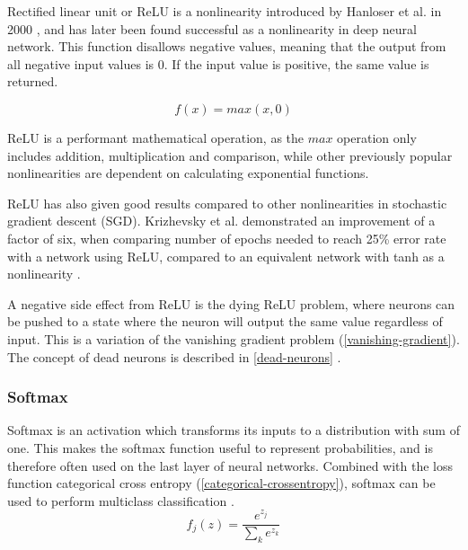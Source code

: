 Rectified linear unit or ReLU is a nonlinearity introduced by Hanloser et al. in 2000 \cite{smith_scientist_1997}, and has later been found successful as a nonlinearity in deep neural network. This function disallows negative values, meaning that the output from all negative input values is 0. If the input value is positive, the same value is returned.


\begin{equation} \label{eqn:relu}
    f(x) = max(x, 0)
\end{equation}

ReLU is a performant mathematical operation, as the $max$ operation only includes addition, multiplication and comparison, while other previously popular nonlinearities are dependent on calculating exponential functions. 

ReLU has also given good results compared to other nonlinearities in stochastic gradient descent (SGD). Krizhevsky et al. demonstrated an improvement of a factor of six, when comparing number of epochs needed to reach 25\% error rate with a network using ReLU, compared to an equivalent network with tanh as a nonlinearity \cite{krizhevsky_imagenet_2012}.

A negative side effect from ReLU is the dying ReLU problem, where neurons can be pushed to a state where the neuron will output the same value regardless of input. This is a variation of the vanishing gradient problem (\ref{vanishing-gradient}). The concept of dead neurons is described in \ref{dead-neurons}  \cite{zeiler_rectified_2013}.

\subsubsection{Softmax}

Softmax is an activation which transforms its inputs to a distribution with sum of one. This makes the softmax function useful to represent probabilities, and is therefore often used on the last layer of neural networks. Combined with the loss function categorical cross entropy (\ref{categorical-crossentropy}), softmax can be used to perform multiclass classification \cite{_cs231n_????-1}.
\begin{equation} \label{eqn:softmax}
    f_j(z) = \frac{e^{z_j}}{\sum_k e^{z_k}}
\end{equation}

